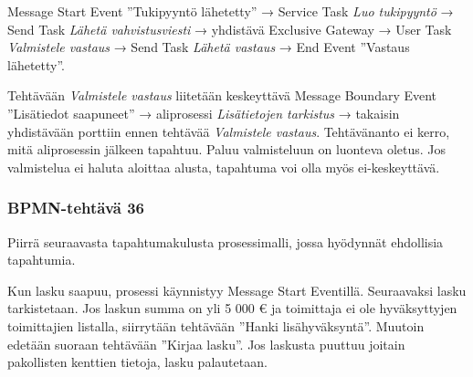 \documentclass[
  finnish,
  letterpaper,
  DIV=11,
  numbers=noendperiod,
  oneside]{scrreprt}
\begin{document}
\begin{tcolorbox}[enhanced jigsaw, arc=.35mm, bottomrule=.15mm, bottomtitle=1mm, breakable, colback=white, colbacktitle=quarto-callout-tip-color!10!white, colframe=quarto-callout-tip-color-frame, coltitle=black, left=2mm, leftrule=.75mm, opacityback=0, opacitybacktitle=0.6, rightrule=.15mm, title=\textcolor{quarto-callout-tip-color}{\faLightbulb}\hspace{0.5em}{Malliratkaisu}, titlerule=0mm, toprule=.15mm, toptitle=1mm]

Message Start Event ''Tukipyyntö lähetetty'' → Service Task \emph{Luo
tukipyyntö} → Send Task \emph{Lähetä vahvistusviesti} → yhdistävä
Exclusive Gateway → User Task \emph{Valmistele vastaus} → Send Task
\emph{Lähetä vastaus} → End Event ''Vastaus lähetetty''.

Tehtävään \emph{Valmistele vastaus} liitetään keskeyttävä Message
Boundary Event ''Lisätiedot saapuneet'' → aliprosessi \emph{Lisätietojen
tarkistus} → takaisin yhdistävään porttiin ennen tehtävää
\emph{Valmistele vastaus}. Tehtävänanto ei kerro, mitä aliprosessin
jälkeen tapahtuu. Paluu valmisteluun on luonteva oletus. Jos valmistelua
ei haluta aloittaa alusta, tapahtuma voi olla myös ei-keskeyttävä.

\end{tcolorbox}

\subsubsection{BPMN-tehtävä 36}\label{bpmn-tehtuxe4vuxe4-36}

Piirrä seuraavasta tapahtumakulusta prosessimalli, jossa hyödynnät
ehdollisia tapahtumia.

Kun lasku saapuu, prosessi käynnistyy Message Start Eventillä.
Seuraavaksi lasku tarkistetaan. Jos laskun summa on yli 5 000 € ja
toimittaja ei ole hyväksyttyjen toimittajien listalla, siirrytään
tehtävään ''Hanki lisähyväksyntä''. Muutoin edetään suoraan tehtävään
''Kirjaa lasku''. Jos laskusta puuttuu joitain pakollisten kenttien
tietoja, lasku palautetaan.
\end{document}
